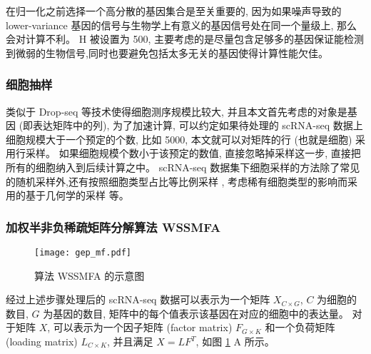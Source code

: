 在归一化之前选择一个高分散的基因集合是至关重要的, 
因为如果噪声导致的 lower-variance 基因的信号与生物学上有意义的基因信号处在同一个量级上, 那么会对计算不利。 
H 被设置为 500, 主要考虑的是尽量包含足够多的基因保证能检测到微弱的生物信号,同时也要避免包括太多无关的基因使得计算性能欠佳。

\subsubsection{细胞抽样}
类似于 Drop-seq 等技术使得细胞测序规模比较大, 并且本文首先考虑的对象是基因 (即表达矩阵中的列), 
为了加速计算, 可以约定如果待处理的 scRNA-seq 数据上细胞规模大于一个预定的个数, 比如 5000,
本文就可以对矩阵的行 (也就是细胞) 采用行采样。
如果细胞规模个数小于该预定的数值, 直接忽略掉采样这一步, 
直接把所有的细胞纳入到后续计算之中。
 scRNA-seq 数据集下细胞采样的方法除了常见的随机采样外,还有按照细胞类型占比等比例采样 ,
考虑稀有细胞类型的影响而采用的基于几何学的采样  等。

\subsubsection{加权半非负稀疏矩阵分解算法 WSSMFA}

\begin{figure}[!htbp]
    \centering
    \texttt{[image: gep\_mf.pdf]}
    \caption{
        算法 WSSMFA 的示意图
    }
    \label{fig:gep-mf}
\end{figure}

经过上述步骤处理后的 scRNA-seq 数据可以表示为一个矩阵 $X_{C \times G}$, $C$ 为细胞的数目, $G$ 为基因的数目, 
矩阵中的每个值表示该基因在对应的细胞中的表达量。
对于矩阵 $X$, 可以表示为一个因子矩阵 (factor matrix) $F_{G \times K}$ 和一个负荷矩阵 (loading matrix) $L_{C \times K}$,
并且满足 $X=LF^T$, 如图 \ref{fig:gep-mf} A 所示。 

